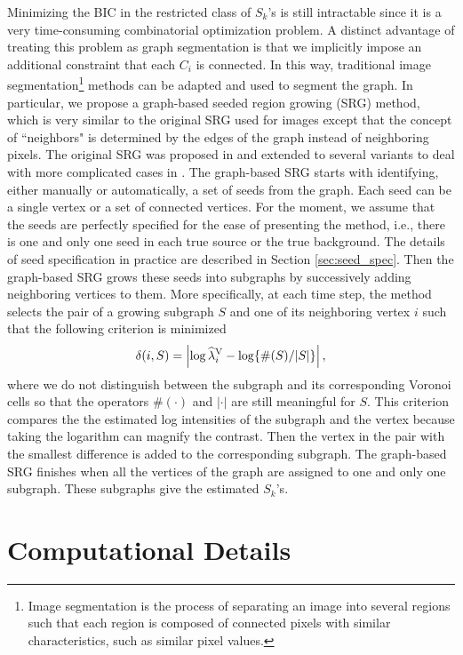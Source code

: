 \documentclass{aastex61}
\begin{document}
Minimizing the BIC in the restricted class of $S_k$'s is still intractable since it is a very time-consuming combinatorial optimization problem.  A distinct advantage of treating this problem as graph segmentation is that we implicitly impose an additional constraint that each $C_i$ is connected. In this way, traditional image segmentation\footnote{Image segmentation is the process of separating an image into several regions such that each region is composed of connected pixels with similar characteristics, such as similar pixel values.} 
methods can be adapted and used to segment the graph. In particular, we propose a graph-based seeded region growing (SRG) method, which is very similar to the original SRG used for images except that the concept of ``neighbors" is determined by the edges of the graph instead of neighboring pixels. The original SRG was proposed in \citet{Adams-94} and extended to several variants to deal with more complicated cases in \citet{Fan-14}. The graph-based SRG starts with identifying, either manually or automatically, a set of seeds from the graph. Each seed can be a single vertex or a set of connected vertices. For the moment, we assume that the seeds are perfectly specified for the ease of presenting the method, i.e., there is one and only one seed in each true source or the true background. The details of seed specification in practice are described in Section \ref{sec:seed_spec}. Then the graph-based SRG grows these seeds into subgraphs by successively adding neighboring vertices to them. More specifically, at each time step, the method selects the pair of a growing subgraph $S$ and one of its neighboring vertex $i$ such that the following criterion is minimized
\begin{equation}\label{eqn: min_criterion}
\delta(i, S)=\left \lvert \log \widehat{\lambda}_i^{\rm V} - \log\{\#(S)/|S|\} \right \rvert,
\end{equation}
where we do not distinguish between the subgraph and its corresponding Voronoi cells so that the operators $\#(\cdot)$ and $|\cdot|$ are still meaningful for $S$. This criterion compares the  
the estimated log intensities of the subgraph and the vertex because taking the logarithm can magnify the contrast. Then the vertex in the pair with the smallest difference is added to the corresponding subgraph.
The graph-based SRG finishes when all the vertices of the graph are assigned to one and only one subgraph. These subgraphs give the estimated $S_k$'s.

\section{Computational Details}
\end{document}

